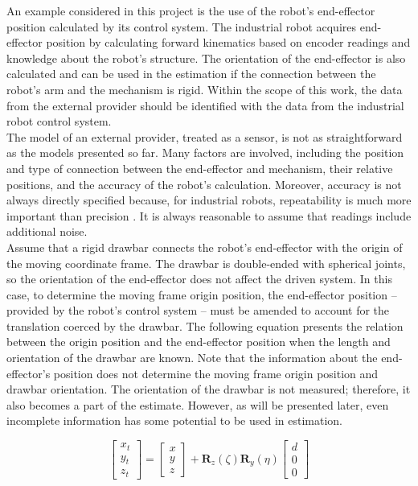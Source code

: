 An example considered in this project is the use of the robot's end-effector position calculated by its control system. The industrial robot acquires end-effector position by calculating forward kinematics based on encoder readings and knowledge about the robot's structure. The orientation of the end-effector is also calculated and can be used in the estimation if the connection between the robot's arm and the mechanism is rigid. Within the scope of this work, the data from the external provider should be identified with the data from the industrial robot control system.\\

The model of an external provider, treated as a sensor, is not as straightforward as the models presented so far. Many factors are involved, including the position and type of connection between the end-effector and mechanism, their relative positions, and the accuracy of the robot’s calculation. Moreover, accuracy is not always directly specified because, for industrial robots, repeatability is much more important than precision \cite{shiakolas2002accuracy}. It is always reasonable to assume that readings include additional noise.\\

Assume that a rigid drawbar connects the robot’s end-effector with the origin of the moving coordinate frame. The drawbar is double-ended with spherical joints, so the orientation of the end-effector does not affect the driven system. In this case, to determine the moving frame origin position, the end-effector position -- provided by the robot’s control system -- must be amended to account for the translation coerced by the drawbar. The following equation presents the relation between the origin position and the end-effector position when the length and orientation of the drawbar are known. Note that the information about the end-effector’s position does not determine the moving frame origin position and drawbar orientation. The orientation of the drawbar is not measured; therefore, it also becomes a part of the estimate. However, as will be presented later, even incomplete information has some potential to be used in estimation.

\begin{equation}
	\begin{bmatrix}
		x_t \\ y_t \\ z_t 
	\end{bmatrix}
	=
	\begin{bmatrix}
		x \\ y \\ z 
	\end{bmatrix}
	+
	\bm{R}_z \left( \zeta \right)
	\bm{R}_y \left( \eta \right)
	\begin{bmatrix}
		d \\ 0 \\ 0 
	\end{bmatrix}
	\label{drawbar_model}
\end{equation}

